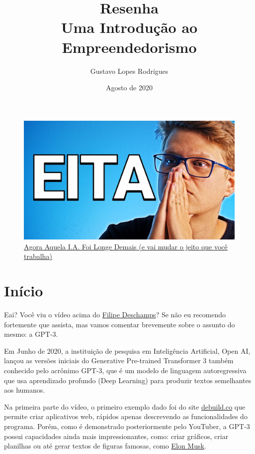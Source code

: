\documentclass[12pt]{article}
\title{Resenha \\ Uma Introdução ao Empreendedorismo}
\author{Gustavo Lopes Rodrigues}
\date{Agosto de 2020}
\begin{document}
    
    \maketitle

    \Large

    \begin{figure}[htp]
        \centering
        \includegraphics[scale=0.3]{maxresdefault.jpg}
        \caption{\href{https://youtu.be/pbVwH8o837A}{Agora Aquela I.A. Foi Longe Demais (e vai mudar o jeito que você trabalha)}}
    \end{figure}
    
    \section{Início}

    Eai? Você viu o vídeo acima do \href{https://br.linkedin.com/in/filipedeschamps}{Filipe Deschamps}? Se não eu recomendo 
    fortemente que assista, mas vamos comentar brevemente sobre o assunto 
    do mesmo: a GPT-3.

    Em Junho de 2020, a instituição de pesquisa em Inteligência Artificial,
    Open AI, lançou as versões iniciais do Generative Pre-trained Transformer 3 também conhecido 
    pelo acrônimo GPT-3, que é um modelo de linguagem autoregressiva que usa 
    aprendizado profundo (Deep Learning) para produzir textos semelhantes aos 
    humanos.

    Na primeira parte do vídeo, o primeiro exemplo dado foi do site \href{https://debuild.co/}{debuild.co} que permite criar aplicativos web, rápidos apenas descrevendo as funcionalidades do programa. 
    Porém, como é demonstrado posteriormente pelo YouTuber, a GPT-3 possui capacidades ainda mais impressionantes, como: criar gráficos, criar planilhas ou até gerar textos de 
    figuras famosas, como \href{https://pt.wikipedia.org/wiki/Elon_Musk}{Elon Musk}.
\end{document}

